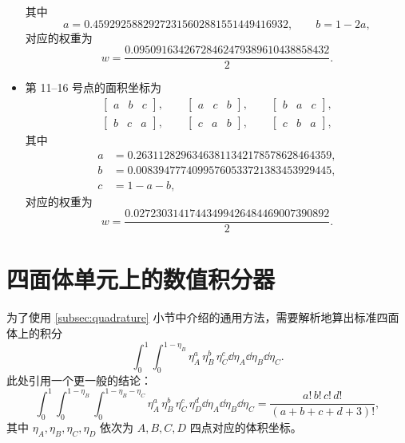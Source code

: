 \begin{itemize}[wide]
\begin{equation}
\end{equation}
其中
\begin{equation}
a=0.45929258829272315602881551449416932,\qquad b=1-2a,
\end{equation}
对应的权重为
\begin{equation}
w=\frac{0.09509163426728462479389610438858432}{2}.
\end{equation}
\item 第 11–16 号点的面积坐标为
\begin{equation}
\begin{gathered}\begin{bmatrix}a & b & c\end{bmatrix},\qquad\begin{bmatrix}a & c & b\end{bmatrix},\qquad\begin{bmatrix}b & a & c\end{bmatrix},\\
\begin{bmatrix}b & c & a\end{bmatrix},\qquad\begin{bmatrix}c & a & b\end{bmatrix},\qquad\begin{bmatrix}c & b & a\end{bmatrix},
\end{gathered}
\end{equation}
其中
\begin{equation}
\begin{aligned}a & =0.26311282963463811342178578628464359,\\
b & =0.00839477740995760533721383453929445,\\
c & =1-a-b,
\end{aligned}
\end{equation}
对应的权重为
\begin{equation}
w=\frac{0.02723031417443499426484469007390892}{2}.
\end{equation}
\end{itemize}
%

\section{四面体单元上的数值积分器}

为了使用 \ref{subsec:quadrature} 小节中介绍的通用方法，需要解析地算出标准四面体上的积分
\begin{equation}
\int_{0}^{1}\int_{0}^{1-\eta_{B}}\eta_{A}^{a}\,\eta_{B}^{b}\,\eta_{C}^{c}\dd{\eta_{A}}\dd{\eta_{B}}\dd{\eta_{C}}.
\end{equation}
此处引用一个更一般的结论：
\begin{equation}
\int_{0}^{1}\int_{0}^{1-\eta_{B}}\int_{0}^{1-\eta_{B}-\eta_{C}}\eta_{A}^{a}\,\eta_{B}^{b}\,\eta_{C}^{c}\,\eta_{D}^{d}\dd{\eta_{A}}\dd{\eta_{B}}\dd{\eta_{C}}=\frac{a!\,b!\,c!\,d!}{(a+b+c+d+3)!},
\end{equation}
其中 $\eta_{A},\eta_{B},\eta_{C},\eta_{D}$ 依次为 $A,B,C,D$ 四点对应的体积坐标。

